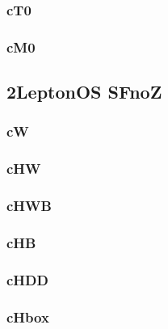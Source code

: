 \documentclass[landscape, 12pt,letterpaper]{article}
\begin{document}
\newpage

\subsubsection{cT0}


\newpage

\subsubsection{cM0}


\newpage

\newpage

\subsection{2LeptonOS SFnoZ}
\subsubsection{cW}


\newpage

\subsubsection{cHW}


\newpage

\subsubsection{cHWB}


\newpage

\subsubsection{cHB}


\newpage

\subsubsection{cHDD}


\newpage

\subsubsection{cHbox}

\end{document}
